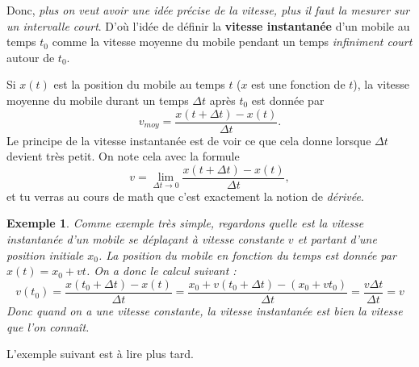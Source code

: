 \documentclass[a4paper,12pt]{book}
\theoremstyle{mes_exemples}	\newtheorem{exemple}[numtho]{Exemple}
\theoremstyle{mes_tho}
\newcommand{\defe}[2]{\textbf{#1}\index{#2}}
\begin{document}
Donc, \emph{plus on veut avoir une idée précise de la vitesse, plus il faut la mesurer sur un intervalle court}. D'où l'idée de définir la \defe{vitesse instantanée}{Vitesse instantanée} d'un mobile au temps $t_0$ comme la vitesse moyenne du mobile pendant un temps \emph{infiniment court} autour de $t_0$. 

Si $x(t)$ est la position du mobile au temps $t$ ($x$ est une fonction de $t$), la vitesse moyenne du mobile durant un temps $\Delta t$ après $t_0$ est donnée par
\[ 
  v_{moy}=\frac{ x(t+\Delta t) -x(t) }{ \Delta t }.
\]
Le principe de la vitesse instantanée est de voir ce que cela donne lorsque $\Delta t$ devient très petit. On note cela avec la formule
\[ 
  v=\lim_{\Delta t\to 0}\frac{ x(t+\Delta t) - x(t) }{ \Delta t },
\]
et tu verras au cours de math que c'est exactement la notion de \emph{dérivée}.

\begin{exemple}		\label{ExoDerrmouvunif}
Comme exemple très simple, regardons quelle est la vitesse instantanée d'un mobile se déplaçant à vitesse constante $v$ et partant d'une position initiale $x_0$. La position du mobile en fonction du temps est donnée par $x(t)=x_0+vt$. On a donc le calcul suivant :
\[ 
  v(t_0)=\frac{ x(t_0+\Delta t)-x(t) }{ \Delta t }=\frac{ x_0+v(t_0+\Delta t)-(x_0+vt_0) }{ \Delta t }=\frac{ v\Delta t }{ \Delta t }=v
\]
Donc quand on a une vitesse constante, la vitesse instantanée est bien la vitesse que l'on connaît.
\end{exemple}

L'exemple suivant est à lire plus tard.
\end{document}
